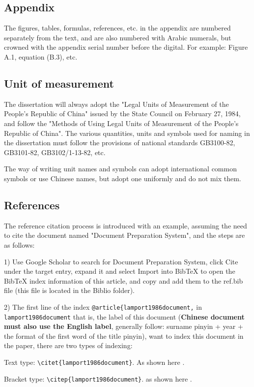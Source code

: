 \subsection{Appendix}
The figures, tables, formulas, references, etc. in the appendix are numbered separately from the text, and are also numbered with Arabic numerals, but crowned with the appendix serial number before the digital. For example: Figure A.1, equation (B.3), etc.
\subsection{Unit of measurement}
The dissertation will always adopt the "Legal Units of Measurement of the People's Republic of China" issued by the State Council on February 27, 1984, and follow the "Methods of Using Legal Units of Measurement of the People's Republic of China". The various quantities, units and symbols used for naming in the dissertation must follow the provisions of national standards GB3100-82, GB3101-82, GB3102/1-13-82, etc.

The way of writing unit names and symbols can adopt international common symbols or use Chinese names, but adopt one uniformly and do not mix them.

\subsection{References}

The reference citation process is introduced with an example, assuming the need to cite the document named "Document Preparation System", and the steps are as follows:

1) Use Google Scholar to search for Document Preparation System, click Cite under the target entry, expand it and select Import into BibTeX to open the BibTeX index information of this article, and copy and add them to the ref.bib file (this file is located in the Biblio folder).

2) The first line of the index \verb|@article{lamport1986document,| in \verb|lamport1986document| that is, the label of this document (\textbf{Chinese document must also use the English label}, generally follow: surname pinyin + year + the format of the first word of the title pinyin), want to index this document in the paper, there are two types of indexing:

Text type: \verb|\citet{lamport1986document}|. As shown here \citet{lamport1986document}. 

Bracket type: \verb|\citep{lamport1986document}|. as shown here \citep{lamport1986document}.

